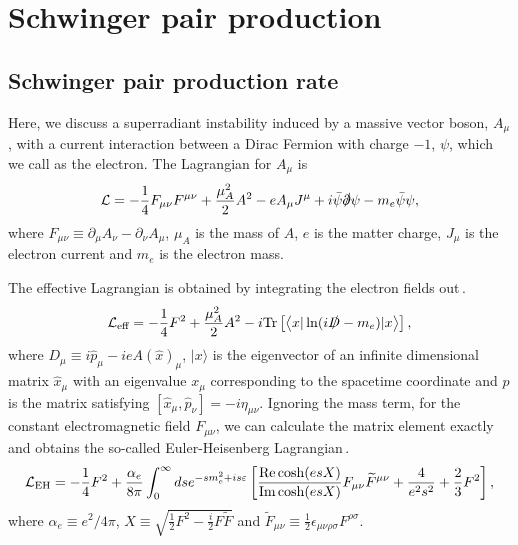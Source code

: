 \documentclass[%
 preprint,
 nofootinbib,
 amsmath,amssymb,
 aps,
 a4paper
]{revtex4-1}
\begin{document}
\appendix

\section{Schwinger pair production}  \label{sec:Sch}


\subsection{Schwinger pair production rate} 

Here, we discuss a superradiant instability induced by a massive vector boson, $A_\mu$, with a current interaction between a Dirac Fermion with charge $-1$, $\psi$, which we call as the electron.
The Lagrangian for $A_\mu$ is
\begin{align}
    \mathcal{L} = -\frac{1}{4}F_{\mu\nu} F^{\mu\nu} + \frac{\mu_A^2}{2} A^2 - e A_\mu J^\mu + i\bar{\psi}\slashed{\partial}\psi - m_e \bar{\psi}\psi,
\end{align}
where $F_{\mu\nu} \equiv \partial_\mu A_\nu - \partial_\nu A_\mu$, $\mu_A$ is the mass of $A$, $e$ is the matter charge, $J_\mu$ is the electron current and $m_e$ is the electron mass.

The effective Lagrangian is obtained by integrating the electron fields out\,\cite{Schwartz:2013pla,Itzykson:1980rh}.
\begin{align}
    \mathcal{L}_\text{eff} = -\frac{1}{4}F^2 + \frac{\mu_A^2}{2} A^2 - i \text{Tr}\left[\left\langle x |\ln(i\slashed{D} - m_e) |x \right\rangle\right],
\end{align}
where $D_\mu \equiv i\hat{p}_\mu - ieA(\hat{x})_\mu$, $|x\rangle$ is the eigenvector of an infinite dimensional matrix $\hat{x}_\mu$ with an eigenvalue $x_\mu$ corresponding to the spacetime coordinate and $\hat{p}$ is the matrix satisfying $[\hat x_\mu, \hat p_\nu] = -i\eta_{\mu\nu}$.
Ignoring the mass term, for the constant electromagnetic field $F_{\mu\nu}$, we can calculate the matrix element exactly and obtains the so-called Euler-Heisenberg Lagrangian\,\cite{Heisenberg1936}. 
\begin{align}
\label{eq:Euler_Heisenberg}
    \mathcal{L}_{\rm EH} = -\frac{1}{4}F^2 + \frac{\alpha_e}{8\pi} \int_0^\infty ds e^{-sm_e^2 + is\varepsilon} \left[\frac{\text{Re}\cosh(e s X)}{\text{Im}\cosh(e s X)} F_{\mu\nu}\widetilde{F}^{\mu\nu} + \frac{4}{e^2s^2} + \frac{2}{3}F^2\right],
\end{align}
where $\alpha_e\equiv e^2 / 4\pi$, $X\equiv\sqrt{\frac12 F^2 - \frac i2F\widetilde F}$ and $\widetilde{F}_{\mu\nu} \equiv \frac12 \epsilon_{\mu\nu\rho\sigma} F^{\rho\sigma}$.
\end{document}
